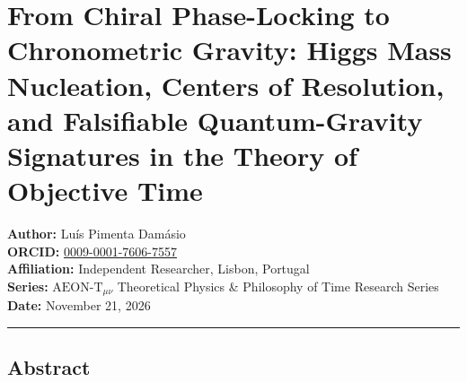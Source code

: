 \documentclass[
]{article}
\author{}
\date{}
\begin{document}
\section{From Chiral Phase-Locking to Chronometric Gravity: Higgs Mass
Nucleation, Centers of Resolution, and Falsifiable Quantum-Gravity
Signatures in the Theory of Objective
Time}\label{from-chiral-phase-locking-to-chronometric-gravity-higgs-mass-nucleation-centers-of-resolution-and-falsifiable-quantum-gravity-signatures-in-the-theory-of-objective-time}

\textbf{Author:} Luís Pimenta Damásio\\
\textbf{ORCID:}
\href{https://orcid.org/0009-0001-7606-7557}{0009-0001-7606-7557}\\
\textbf{Affiliation:} Independent Researcher, Lisbon, Portugal\\
\textbf{Series:} \(\text{AEON-T}_{\mu\nu}\) Theoretical Physics \&
Philosophy of Time Research Series\\
\textbf{Date:} November 21, 2026

\begin{center}\rule{0.5\linewidth}{0.5pt}\end{center}

\subsection{Abstract}\label{abstract}
\end{document}
